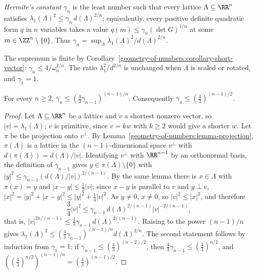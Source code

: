 \begin{definition}\label{geometry-of-numbers:definition-hermite}
\emph{Hermite's constant} $\gamma_n$ is the least number such that every lattice $\Lambda \subseteq \RR^n$ satisfies $\lambda_1(\Lambda)^2 \leq \gamma_n\,d(\Lambda)^{2/n}$; equivalently, every
positive definite quadratic form $q$ in $n$ variables takes a value $q(m) \leq \gamma_n(\det G)^{1/n}$ at some $m \in \ZZ^n \setminus \{0\}$. Thus
$\gamma_n = \sup_\Lambda\lambda_1(\Lambda)^2/d(\Lambda)^{2/n}$.
\end{definition}

The supremum is finite by Corollary~\ref{geometry-of-numbers:corollary-short-vector}: $\gamma_n \leq 4/\omega_n^{2/n}$. The ratio $\lambda_1^2/d^{2/n}$ is unchanged when $\Lambda$ is scaled or rotated,
and $\gamma_1 = 1$.

\begin{theorem}[Hermite]\label{geometry-of-numbers:theorem-hermite}
For every $n \geq 2$, $\gamma_n \leq (\frac43\gamma_{n-1})^{(n-1)/n}$. Consequently $\gamma_n \leq (\frac43)^{(n-1)/2}$.
\end{theorem}

\begin{proof}
Let $\Lambda \subseteq \RR^n$ be a lattice and $v$ a shortest nonzero vector, so $|v| = \lambda_1(\Lambda)$; $v$ is primitive, since $v = kw$ with $k \geq 2$ would give a shorter $w$. Let $\pi$ be the
projection onto $v^\perp$. By Lemma~\ref{geometry-of-numbers:lemma-projection}, $\pi(\Lambda)$ is a lattice in the $(n - 1)$-dimensional space $v^\perp$ with $d(\pi(\Lambda)) = d(\Lambda)/|v|$. Identifying
$v^\perp$ with $\RR^{n-1}$ by an orthonormal basis, the definition of $\gamma_{n-1}$ gives $y \in \pi(\Lambda) \setminus \{0\}$ with $|y|^2 \leq \gamma_{n-1}(d(\Lambda)/|v|)^{2/(n-1)}$. By the same lemma
there is $x \in \Lambda$ with $\pi(x) = y$ and $|x - y| \leq \frac12|v|$; since $x - y$ is parallel to $v$ and $y \perp v$, $|x|^2 = |y|^2 + |x - y|^2 \leq |y|^2 + \frac14|v|^2$. As $y \neq 0$, $x \neq 0$, so
$|v|^2 \leq |x|^2$, and therefore
\[
\frac34|v|^2 \leq \gamma_{n-1}\,d(\Lambda)^{2/(n-1)}|v|^{-2/(n-1)},
\]
that is, $|v|^{2n/(n-1)} \leq \frac43\gamma_{n-1}\,d(\Lambda)^{2/(n-1)}$.
Raising to the power $(n - 1)/n$ gives $\lambda_1(\Lambda)^2 \leq (\frac43\gamma_{n-1})^{(n-1)/n}d(\Lambda)^{2/n}$. The second statement follows by induction from $\gamma_1 = 1$: if
$\gamma_{n-1} \leq (\frac43)^{(n-2)/2}$, then $\frac43\gamma_{n-1} \leq (\frac43)^{n/2}$, and $((\frac43)^{n/2})^{(n-1)/n} = (\frac43)^{(n-1)/2}$.
\end{proof}

